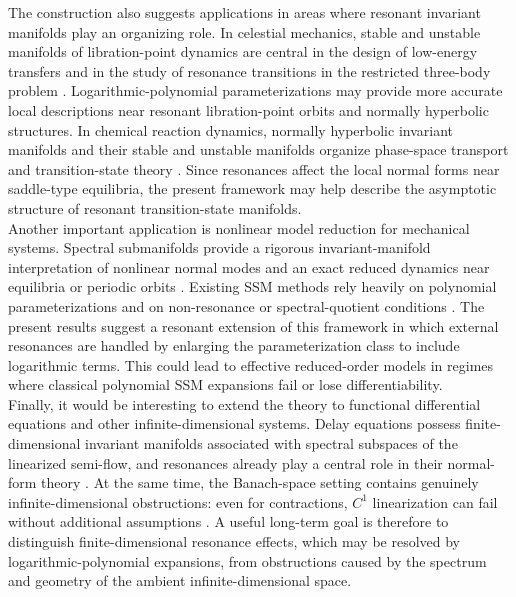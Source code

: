 \documentclass{amsart}
\theoremstyle{plain}
\theoremstyle{definition}
\begin{document}
The construction also suggests applications in areas where resonant invariant manifolds play an organizing role.  In celestial mechanics, stable and unstable manifolds of libration-point dynamics are central in the design of low-energy transfers and in the study of resonance transitions in the restricted three-body problem \cite{koon2000heteroclinic,koon2001low,koon2011dynamical,gomez2004connecting}.  Logarithmic-polynomial parameterizations may provide more accurate local descriptions near resonant libration-point orbits and normally hyperbolic structures.  In chemical reaction dynamics, normally hyperbolic invariant manifolds and their stable and unstable manifolds organize phase-space transport and transition-state theory \cite{wiggins1994normally,komatsuzaki2001dynamical,waalkens2004direct,ezra2009microcanonical}. Since resonances affect the local normal forms near saddle-type equilibria, the present framework may help describe the asymptotic structure of resonant transition-state manifolds.\\

Another important application is nonlinear model reduction for mechanical systems.  Spectral submanifolds provide a rigorous invariant-manifold interpretation of nonlinear normal modes and an exact reduced dynamics near equilibria or periodic orbits \cite{shaw1991normal,shaw1993normal,haller2016nonlinear}.  Existing SSM methods rely heavily on polynomial parameterizations and on non-resonance or spectral-quotient conditions \cite{szalai2017nonlinear,breunung2018explicit,jain2018exact,ponsioen2020model,cenedese2022data}.  The present results suggest a resonant extension of this framework in which external resonances are handled by enlarging the parameterization class to include logarithmic terms.  This could lead to effective reduced-order models in regimes where classical polynomial SSM expansions fail or lose differentiability.\\

Finally, it would be interesting to extend the theory to functional differential equations and other infinite-dimensional systems.  Delay equations possess finite-dimensional invariant manifolds associated with spectral subspaces of the linearized semi-flow, and resonances already play a central role in their normal-form theory \cite{hale1993introduction,dieckmann1995delay,faria1995normal}.  At the same time, the Banach-space setting contains genuinely infinite-dimensional obstructions: even for contractions, $C^1$ linearization can fail without additional assumptions \cite{rodrigues2004linearization,rodrigues2005invertible,rodrigues2012known}.  A useful long-term goal is therefore to distinguish finite-dimensional resonance effects, which may be resolved by logarithmic-polynomial expansions, from obstructions caused by the spectrum and geometry of the ambient infinite-dimensional space.\\
\end{document}
